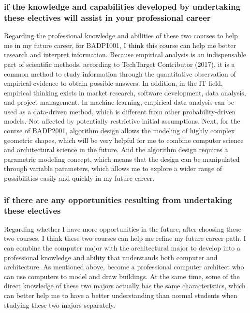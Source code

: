 \documentclass[../draft.tex]{subfiles}
\begin{document}
\subsubsection{if the knowledge and capabilities developed by undertaking these electives will assist in your professional career}
Regarding the professional knowledge and abilities of these two courses to help me in my future career, for BADP1001, I think this course can help me better research and interpret information. Because empirical analysis is an indispensable part of scientific methods, according to TechTarget Contributor (2017), it is a common method to study information through the quantitative observation of empirical evidence to obtain possible answers. In addition, in the IT field, empirical thinking exists in market research, software development, data analysis, and project management. In machine learning, empirical data analysis can be used as a data-driven method, which is different from other probability-driven models. Not affected by potentially restrictive initial assumptions. Next, for the course of BADP2001, algorithm design allows the modeling of highly complex geometric shapes, which will be very helpful for me to combine computer science and architectural science in the future. And the algorithm design requires a parametric modeling concept, which means that the design can be manipulated through variable parameters, which allows me to explore a wider range of possibilities easily and quickly in my future career.
\subsubsection{if there are any opportunities resulting from undertaking these electives}
Regarding whether I have more opportunities in the future, after choosing these two courses, I think these two courses can help me refine my future career path. I can combine the computer major with the architectural major to develop into a professional knowledge and ability that understands both computer and architecture. As mentioned above, become a professional computer architect who can use computers to model and draw buildings. At the same time, some of the direct knowledge of these two majors actually has the same characteristics, which can better help me to have a better understanding than normal students when studying these two majors separately.
\end{document}

